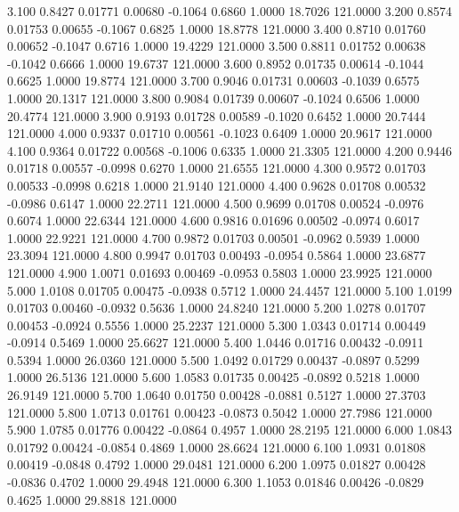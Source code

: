    3.100   0.8427   0.01771   0.00680  -0.1064   0.6860   1.0000  18.7026 121.0000
   3.200   0.8574   0.01753   0.00655  -0.1067   0.6825   1.0000  18.8778 121.0000
   3.400   0.8710   0.01760   0.00652  -0.1047   0.6716   1.0000  19.4229 121.0000
   3.500   0.8811   0.01752   0.00638  -0.1042   0.6666   1.0000  19.6737 121.0000
   3.600   0.8952   0.01735   0.00614  -0.1044   0.6625   1.0000  19.8774 121.0000
   3.700   0.9046   0.01731   0.00603  -0.1039   0.6575   1.0000  20.1317 121.0000
   3.800   0.9084   0.01739   0.00607  -0.1024   0.6506   1.0000  20.4774 121.0000
   3.900   0.9193   0.01728   0.00589  -0.1020   0.6452   1.0000  20.7444 121.0000
   4.000   0.9337   0.01710   0.00561  -0.1023   0.6409   1.0000  20.9617 121.0000
   4.100   0.9364   0.01722   0.00568  -0.1006   0.6335   1.0000  21.3305 121.0000
   4.200   0.9446   0.01718   0.00557  -0.0998   0.6270   1.0000  21.6555 121.0000
   4.300   0.9572   0.01703   0.00533  -0.0998   0.6218   1.0000  21.9140 121.0000
   4.400   0.9628   0.01708   0.00532  -0.0986   0.6147   1.0000  22.2711 121.0000
   4.500   0.9699   0.01708   0.00524  -0.0976   0.6074   1.0000  22.6344 121.0000
   4.600   0.9816   0.01696   0.00502  -0.0974   0.6017   1.0000  22.9221 121.0000
   4.700   0.9872   0.01703   0.00501  -0.0962   0.5939   1.0000  23.3094 121.0000
   4.800   0.9947   0.01703   0.00493  -0.0954   0.5864   1.0000  23.6877 121.0000
   4.900   1.0071   0.01693   0.00469  -0.0953   0.5803   1.0000  23.9925 121.0000
   5.000   1.0108   0.01705   0.00475  -0.0938   0.5712   1.0000  24.4457 121.0000
   5.100   1.0199   0.01703   0.00460  -0.0932   0.5636   1.0000  24.8240 121.0000
   5.200   1.0278   0.01707   0.00453  -0.0924   0.5556   1.0000  25.2237 121.0000
   5.300   1.0343   0.01714   0.00449  -0.0914   0.5469   1.0000  25.6627 121.0000
   5.400   1.0446   0.01716   0.00432  -0.0911   0.5394   1.0000  26.0360 121.0000
   5.500   1.0492   0.01729   0.00437  -0.0897   0.5299   1.0000  26.5136 121.0000
   5.600   1.0583   0.01735   0.00425  -0.0892   0.5218   1.0000  26.9149 121.0000
   5.700   1.0640   0.01750   0.00428  -0.0881   0.5127   1.0000  27.3703 121.0000
   5.800   1.0713   0.01761   0.00423  -0.0873   0.5042   1.0000  27.7986 121.0000
   5.900   1.0785   0.01776   0.00422  -0.0864   0.4957   1.0000  28.2195 121.0000
   6.000   1.0843   0.01792   0.00424  -0.0854   0.4869   1.0000  28.6624 121.0000
   6.100   1.0931   0.01808   0.00419  -0.0848   0.4792   1.0000  29.0481 121.0000
   6.200   1.0975   0.01827   0.00428  -0.0836   0.4702   1.0000  29.4948 121.0000
   6.300   1.1053   0.01846   0.00426  -0.0829   0.4625   1.0000  29.8818 121.0000
